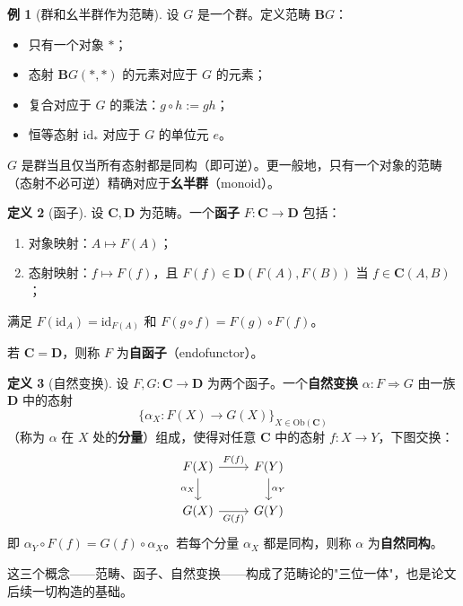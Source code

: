 \documentclass[12pt,a4paper]{ctexart}
\theoremstyle{definition}
\newtheorem{definition}{定义}[section]
\newtheorem{example}[definition]{例}
\newcommand{\cat}[1]{\mathbf{#1}}
\newcommand{\id}{\mathrm{id}}
\newcommand{\ob}[1]{\mathrm{Ob}(#1)}
\begin{document}
\begin{example}[群和幺半群作为范畴]\label{ex:group}
设 $G$ 是一个群。定义范畴 $\mathbf{B}G$：
\begin{itemize}[nosep]
    \item 只有一个对象 $*$；
    \item 态射 $\mathbf{B}G(*,*)$ 的元素对应于 $G$ 的元素；
    \item 复合对应于 $G$ 的乘法：$g\circ h:=gh$；
    \item 恒等态射 $\id_*$ 对应于 $G$ 的单位元 $e$。
\end{itemize}
$G$ 是群当且仅当所有态射都是同构（即可逆）。更一般地，只有一个对象的范畴（态射不必可逆）精确对应于\textbf{幺半群}（monoid）。
\end{example}

\begin{definition}[函子]\label{def:functor}
设 $\cat C,\cat D$ 为范畴。一个\textbf{函子} $F:\cat C\to\cat D$ 包括：
\begin{enumerate}[label=(\arabic*),nosep]
    \item 对象映射：$A\mapsto F(A)$；
    \item 态射映射：$f\mapsto F(f)$，且 $F(f)\in\cat D(F(A),F(B))$ 当 $f\in\cat C(A,B)$；
\end{enumerate}
满足 $F(\id_A)=\id_{F(A)}$ 和 $F(g\circ f)=F(g)\circ F(f)$。
\end{definition}

若 $\cat C=\cat D$，则称 $F$ 为\textbf{自函子}（endofunctor）。

\begin{definition}[自然变换]\label{def:natural}
设 $F,G:\cat C\to\cat D$ 为两个函子。一个\textbf{自然变换} $\alpha:F\Rightarrow G$ 由一族 $\cat D$ 中的态射
\[\{\alpha_X:F(X)\to G(X)\}_{X\in\ob{\cat C}}\]
（称为 $\alpha$ 在 $X$ 处的\textbf{分量}）组成，使得对任意 $\cat C$ 中的态射 $f:X\to Y$，下图交换：
\begin{equation}\label{eq:nat-square}
\begin{tikzcd}
F(X) \arrow[r,"F(f)"] \arrow[d,"\alpha_X"'] & F(Y) \arrow[d,"\alpha_Y"] \\
G(X) \arrow[r,"G(f)"'] & G(Y)
\end{tikzcd}
\end{equation}
即 $\alpha_Y\circ F(f)=G(f)\circ\alpha_X$。若每个分量 $\alpha_X$ 都是同构，则称 $\alpha$ 为\textbf{自然同构}。
\end{definition}

这三个概念——范畴、函子、自然变换——构成了范畴论的"三位一体"，也是论文后续一切构造的基础。
\end{document}
